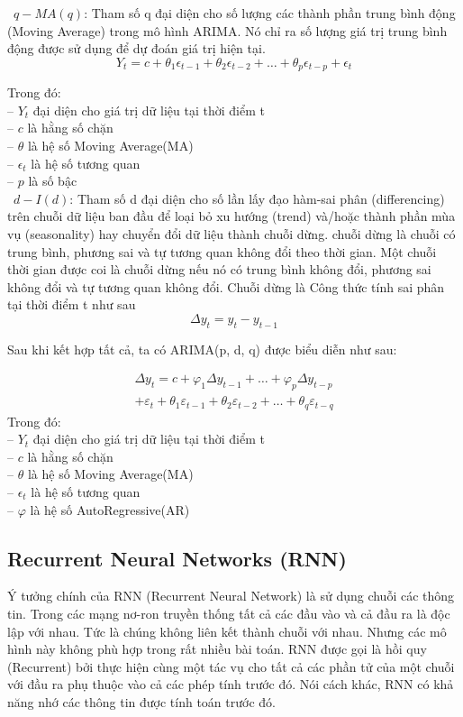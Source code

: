 \documentclass[conference]{IEEEtran}
\begin{document}
\indent\textbullet\ \(q-MA(q)\): Tham số q đại diện cho số lượng các thành phần trung bình động (Moving Average) trong mô hình ARIMA. Nó chỉ ra số lượng giá trị trung bình động được sử dụng để dự đoán giá trị hiện tại.\\
\[
    Y_t = c + \theta_1 \epsilon_{t-1} + \theta_2 \epsilon_{t-2} + \ldots + \theta_p \epsilon_{t-p} + \epsilon_t
\]

Trong đó: \\
\indent -- \(Y_t\) đại diện cho giá trị dữ liệu tại thời điểm t\\
\indent -- \(c\) là hằng số chặn\\
\indent -- \(\theta\) là hệ số Moving Average(MA)\\
\indent -- \(\epsilon_t\) là hệ số tương quan\\
\indent -- \(p\) là số bậc \\

\indent\textbullet\  \(d-I(d)\): Tham số d đại diện cho số lần lấy đạo hàm-sai phân (differencing) trên chuỗi dữ liệu ban đầu để loại bỏ xu hướng (trend) và/hoặc thành phần mùa vụ (seasonality) hay chuyển đổi dữ liệu thành chuỗi dừng. chuỗi dừng là chuỗi có trung bình, phương sai và tự tương quan không đổi theo thời gian. Một chuỗi thời gian được coi là chuỗi dừng nếu nó có trung bình không đổi, phương sai không đổi và tự tương quan không đổi. Chuỗi dừng là Công thức tính sai phân tại thời điểm t như sau
\[
    \Delta y_t = y_t - y_{t-1}
\]

Sau khi kết hợp tất cả, ta có ARIMA(p, d, q) được biểu diễn như sau:

\begin{multline}
    \Delta y_t = c + \varphi_1 \Delta y_{t-1} + \ldots + \varphi_p \Delta y_{t-p} \\
    + \varepsilon_t + \theta_1 \varepsilon_{t-1} + \theta_2 \varepsilon_{t-2}
    + \ldots + \theta_q \varepsilon_{t-q}
\end{multline}
Trong đó: \\
\indent -- \(Y_t\) đại diện cho giá trị dữ liệu tại thời điểm t\\
\indent -- \(c\) là hằng số chặn\\
\indent -- \(\theta\) là hệ số Moving Average(MA)\\
\indent -- \(\epsilon_t\) là hệ số tương quan\\
\indent -- \(\varphi\) là hệ số AutoRegressive(AR)\\


\subsection{Recurrent Neural Networks (RNN)}
Ý tưởng chính của RNN (Recurrent Neural Network) là sử dụng chuỗi các thông tin. Trong các mạng nơ-ron truyền thống tất cả các đầu vào và cả đầu ra là độc lập với nhau. Tức là chúng không liên kết thành chuỗi với nhau. Nhưng các mô hình này không phù hợp trong rất nhiều bài toán. RNN được gọi là hồi quy (Recurrent) bởi thực hiện cùng một tác vụ cho tất cả các phần tử của một chuỗi với đầu ra phụ thuộc vào cả các phép tính trước đó. Nói cách khác, RNN có khả năng nhớ các thông tin được tính toán trước đó.
\end{document}
